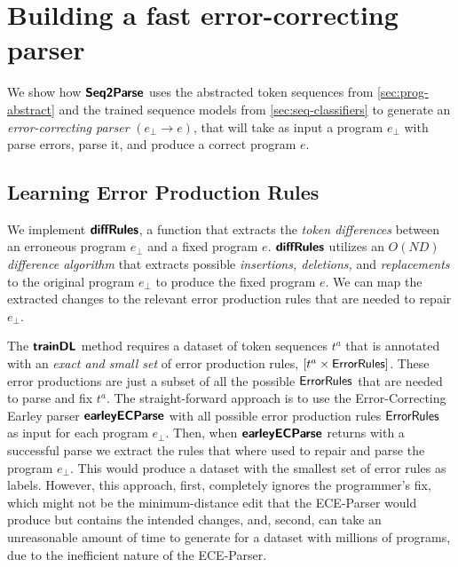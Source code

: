\section{Building a fast error-correcting parser}
\label{sec:whole-system}

We show how $\bm{\mathsf{Seq2Parse}}$ uses the abstracted token sequences from
\autoref{sec:prog-abstract} and the trained sequence models from
\autoref{sec:seq-classifiers} to generate an \emph{error-correcting parser}
$(e_{\bot} \to e)$, that will take as input a program $e_{\bot}$ with parse
errors, parse it, and produce a correct program $e$.


\subsection{Learning Error Production Rules}
\label{sec:whole-system:error-rules}
We implement $\bm{\mathsf{diffRules}}$, a function that extracts the \emph{token differences}
between an erroneous program $e_{\bot}$ and a fixed program $e$. $\bm{\mathsf{diffRules}}$
utilizes an \emph{$O(ND)$ difference algorithm} \citep{Myers_1986} that extracts
possible \emph{insertions, deletions,} and \emph{replacements} to the original
program $e_{\bot}$ to produce the fixed program $e$. We can map the extracted
changes to the relevant error production rules that are needed to repair
$e_{\bot}$.

The $\bm{\mathsf{trainDL}}$ method requires a dataset of token sequences $t^a$ that is
annotated with an \emph{exact and small set} of error production rules, \ie
$[t^a \times \mathsf{ErrorRules}]$. These error productions are just a subset of
all the possible $\mathsf{ErrorRules}$ that are needed to parse and fix $t^a$. The
straight-forward approach is to use the Error-Correcting Earley parser
$\bm{\mathsf{earleyECParse}}$ with all possible error production rules $\mathsf{ErrorRules}$ as input
for each program $e_{\bot}$. Then, when $\bm{\mathsf{earleyECParse}}$ returns with a successful
parse we extract the rules that where used to repair and parse the program
$e_{\bot}$. This would produce a dataset with the smallest set of error rules as
labels. However, this approach, first, completely ignores the programmer's fix,
which might not be the minimum-distance edit that the ECE-Parser would produce
but contains the intended changes, and, second, can take an unreasonable amount
of time to generate for a dataset with millions of programs, due to the
inefficient nature of the ECE-Parser.

